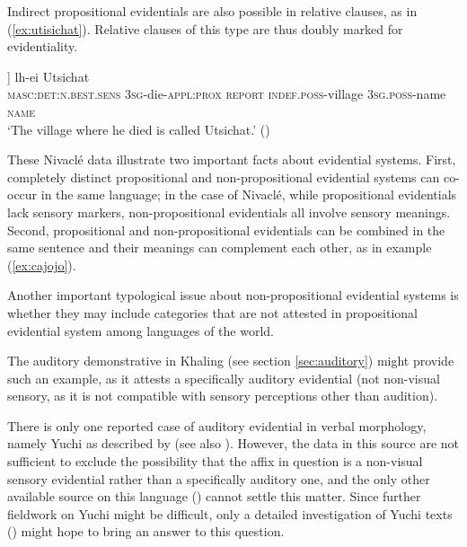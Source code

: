 \documentclass[oneside,a4paper,11pt]{article}
\newcommand{\ipa}[1]{{\phon \mbox{#1}}} %
\begin{document}
Indirect propositional evidentials are also possible in relative clauses, as in (\ref{ex:utisichat}).  Relative clauses of this type are thus doubly marked for evidentiality.

\begin{exe}
\ex \label{ex:utisichat}
\gll
[\ipa{pa} 	[\ipa{Ø-vaf-’e} 	\ipa{lhôn}] 	\ipa{yi-tsaat}] 	\ipa{lh-ei} 	\ipa{Utsichat} \\
\textsc{masc:det:n.best.sens} \textsc{3sg}-die-\textsc{appl:prox} \textsc{report} \textsc{indef.poss}-village \textsc{3sg.poss}-name \textsc{name} \\
\glt `The village where he died is called Utsichat.' (\citealt[157]{fabre14nivacle})
\end{exe}

These Nivaclé data illustrate two important facts about evidential systems. First, completely distinct propositional and non-propositional evidential systems can co-occur in the same language; in the case of Nivaclé, while propositional evidentials lack sensory markers, non-propositional evidentials all involve sensory meanings. Second, propositional and non-propositional evidentials can be combined in the same sentence and their meanings can complement each other, as in example (\ref{ex:cajojo}).
 


Another important typological issue about non-propositional evidential systems is whether they may include categories that are not attested in propositional evidential system among languages of the world.

The auditory demonstrative in Khaling (see section \ref{sec:auditory}) might provide such an example, as it attests a specifically auditory evidential (not non-visual sensory, as it is not compatible with sensory perceptions other than audition).

   There is only one reported case of auditory evidential in verbal morphology, namely  Yuchi as described by \citet{linn01euchee} (see also \citealt[37]{aikhenvald06}). However, the data in this source are not sufficient to exclude the possibility that the affix in question is a non-visual sensory evidential rather than a specifically auditory one, and the only other available source on this language (\citealt{wagner38yuchi}) cannot settle this matter. Since further fieldwork on Yuchi might be difficult, only a detailed investigation of Yuchi texts (\citealt{wagner31tales}) might hope to bring an answer to this question.
\end{document}
